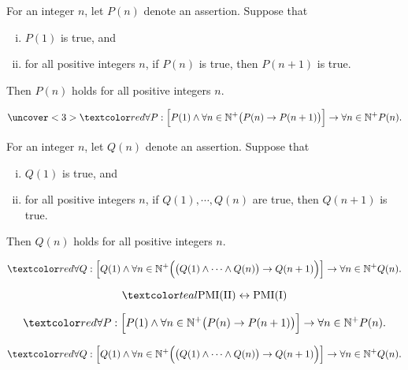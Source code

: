 
\begin{frame}{}
  \begin{theorem}
    For an integer $n$, let $P(n)$ denote an assertion. Suppose that
    \begin{enumerate}[(i)]
      \item $P(1)$ is true, and
      \item for all positive integers $n$, if $P(n)$ is true, then $P(n+1)$ is true.
    \end{enumerate}
    Then $P(n)$ holds for all positive integers $n$.
  \end{theorem}

  \pause
  \vspace{0.60cm}
  \[
    \uncover<3>{\red{\forall P:}}\; 
    \Big[ P(1) \land \forall n \in \mathbb{N}^{+} \big(P(n) \to P(n+1) \big) \Big]
      \to \forall n \in \mathbb{N}^{+} P(n).
  \]
\end{frame}

\begin{frame}{}
  \begin{theorem}
    For an integer $n$, let $Q(n)$ denote an assertion. Suppose that
    \begin{enumerate}[(i)]
      \item $Q(1)$ is true, and
      \item for all positive integers $n$, if $Q(1), \cdots, Q(n)$ are true,
	then $Q(n+1)$ is true.
    \end{enumerate}
    Then $Q(n)$ holds for all positive integers $n$.
  \end{theorem}

  \pause
  \vspace{0.30cm}
  \[
    \red{\forall Q:}\; 
    \Big[ Q(1) \land \forall n \in \mathbb{N}^{+} \Big(\big(Q(1) \land \cdots \land Q(n)\big) \to Q(n+1) \Big) \Big] 
      \to \forall n \in \mathbb{N}^{+} Q(n).
  \]
\end{frame}

\begin{frame}{}
  \[
    \teal{\text{PMI(II)} \leftrightarrow \text{PMI(I)}}
  \]

  \[
    \red{\forall P:}\; 
    \Big[ P(1) \land \forall n \in \mathbb{N}^{+} \big(P(n) \to P(n+1) \big) \Big]
      \to \forall n \in \mathbb{N}^{+} P(n).
  \]

  \[
    \red{\forall Q:}\; 
    \Big[ Q(1) \land \forall n \in \mathbb{N}^{+} \Big(\big(Q(1) \land \cdots \land Q(n)\big) \to Q(n+1) \Big) \Big] 
      \to \forall n \in \mathbb{N}^{+} Q(n).
  \]

  \pause
  \vspace{0.50cm}
  \begin{center}
    {\it {}}
  \end{center}
\end{frame}

